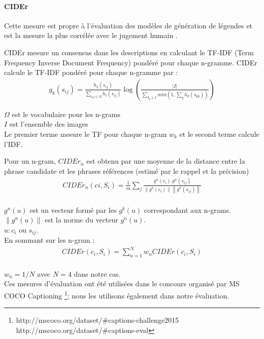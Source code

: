 \paragraph{CIDEr \cite{vedantam2015cider}}
Cette mesure est propre à l'évaluation des modèles de génération de légendes et est la mesure la plus corrélée avec le jugement humain \cite{vinyals2016show}.

CIDEr mesure un consensus dans les descriptions en calculant le TF-IDF (Term Frequency Inverse Document Frequency) pondéré pour chaque n-gramme. CIDEr calcule le TF-IDF pondéré pour chaque n-gramme par :
\begin{eqnarray}
g_{k}(s_{ij})= \frac{h_k(s_{ij})}{\sum_{\omega_{l}\in \Omega}h_{t}(s_{ij})} \log \left(\frac{|I|}{\sum_{I_{p}\in I}min \left ( 1,\sum_{q}h_{k}(s_{pq}) \right) } \right )
\end{eqnarray}

$\Omega$ est le vocabulaire pour les n-grams\\
$I$ est l'ensemble des images\\
Le premier terme mesure le TF pour chaque n-gram $w_{k}$ et le second terme calcule l'IDF.

Pour un n-gram, $CIDEr _{n}$ est obtenu par une moyenne de la distance entre la phrase candidate et les phrases références (estimé par le rappel et la précision)
\begin{eqnarray}
CIDEr_{n}(ci,S_{i})= \frac{1}{m} \sum_{j} \frac{g^{n}(c_{i}).g^{n}(s_{ij})}{\left \|g^{n}(c_{i})  \right \| \left \|g^{n}(s_{ij})  \right \|}
\end{eqnarray}\\
$g^n(u)$ est un vecteur formé par les $g^k(u)$ correspondant aux n-grams.\\
$\left \|g^{n}(u)  \right \| $ est la norme du vecteur $g^n(u)$.\\
$u : c_{i}$ ou $s_{ij}$.\\
En sommant sur les n-gram :
\begin{eqnarray}
CIDEr(c_{i},S_{i})=\sum_{n=1}^{N} w_{n}CIDEr(c_{i},S_{i})
\end{eqnarray}\\
$ w_{n} = 1/N $ avec $N=4$ dans notre cas.
\\

Ces mesures d'évaluation ont été utilisées dans le concours organisé par MS COCO Captioning \footnote{http://mscoco.org/dataset/\#captions-challenge2015 http://mscoco.org/dataset/\#captions-eval}; nous les utilisons également dans notre évaluation.

